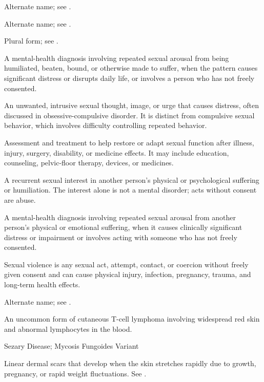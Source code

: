  Alternate name; see .

 Alternate name; see .

 Plural form; see .

 A mental-health diagnosis involving repeated sexual arousal from being humiliated, beaten, bound, or otherwise made to suffer, when the pattern causes significant distress or disrupts daily life, or involves a person who has not freely consented.

 An unwanted, intrusive sexual thought, image, or urge that causes distress, often discussed in obsessive-compulsive disorder. It is distinct from compulsive sexual behavior, which involves difficulty controlling repeated behavior.

 Assessment and treatment to help restore or adapt sexual function after illness, injury, surgery, disability, or medicine effects. It may include education, counseling, pelvic-floor therapy, devices, or medicines.

 A recurrent sexual interest in another person’s physical or psychological suffering or humiliation. The interest alone is not a mental disorder; acts without consent are abuse.

 A mental-health diagnosis involving repeated sexual arousal from another person’s physical or emotional suffering, when it causes clinically significant distress or impairment or involves acting with someone who has not freely consented.

 Sexual violence is any sexual act, attempt, contact, or coercion without freely given consent and can cause physical injury, infection, pregnancy, trauma, and long-term health effects.

 Alternate name; see .

 An uncommon form of cutaneous T-cell lymphoma involving widespread red skin and abnormal lymphocytes in the blood.

\synonyms
Sezary Disease; Mycosis Fungoides Variant

 Linear dermal scars that develop when the skin stretches rapidly due to growth, pregnancy, or rapid weight fluctuations. See .

